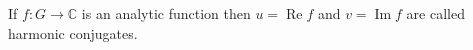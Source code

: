 If $f: G \to \mathbb{C}$ is an analytic function then $u = \operatorname{Re} f$ and $v = \operatorname{Im} f$ are called harmonic conjugates.
